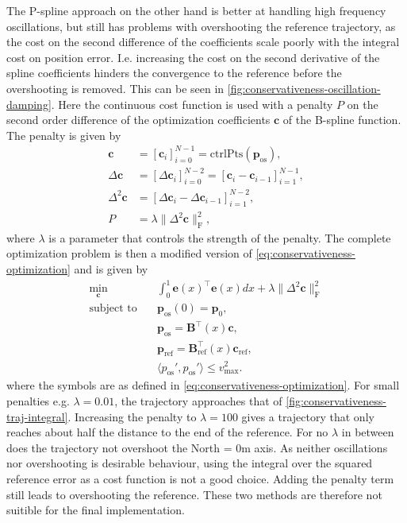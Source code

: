 The P-spline approach on the other hand is better at handling high frequency oscillations, but still has problems with overshooting the reference trajectory, as the cost on the second difference of the coefficients scale poorly with the integral cost on position error. I.e. increasing the cost on the second derivative of the spline coefficients hinders the convergence to the reference before the overshooting is removed. This can be seen in \cref{fig:conservativeness-oscillation-damping}. Here the continuous cost function is used with a penalty $P$ on the second order difference of the optimization coefficients $\mathbf c$ of the B-spline function. The penalty is given by
\begin{equation}\label{eq:conservativeness-oscillation-damping}
    \begin{aligned}
        \mathbf c &= [\mathbf c_i]_{i=0}^{N-1} =
        \text{ctrlPts}\left(\mathbf{p}_\text{os}\right), \\
        \Delta \mathbf c &= [\Delta\mathbf c_i]_{i=0}^{N-2} =
        [\mathbf c_i - \mathbf c_{i-1}]_{i=1}^{N-1}, \\
        \Delta^2 \mathbf c &= [\Delta \mathbf c_i - \Delta \mathbf c_{i-1}]_{i=1}^{N-2}, \\
        P &= \lambda \|\Delta^2 \mathbf c\|_\text{F}^2,
    \end{aligned}
\end{equation}
where $\lambda$ is a parameter that controls the strength of the penalty. The complete optimization problem is then a modified version of \cref{eq:conservativeness-optimization} and is given by
\begin{equation}\label{eq:conservativeness-optimization-penalty}
    \begin{aligned}
        \min_{\mathbf c} \quad & \int_0^1 \mathbf e(x)^\top \mathbf e(x) dx + \lambda \|\Delta^2 \mathbf c\|_\text{F}^2 \\
        \text{subject to} \quad &\mathbf p_\text{os}(0) = \mathbf p_0, \\
                     &\mathbf p_\text{os} = \mathbf B^\top(x) \mathbf c, \\
                     &\mathbf p_\text{ref} = \mathbf B_\text{ref}^\top(x) \mathbf c_\text{ref}, \\
                     &\langle p_\text{os}', p_\text{os}' \rangle \le v_\text{max}^2.
    \end{aligned}
\end{equation}
where the symbols are as defined in \cref{eq:conservativeness-optimization}.
For small penalties e.g. $\lambda=0.01$, the trajectory approaches that of \cref{fig:conservativeness-traj-integral}. Increasing the penalty to $\lambda=100$ gives a trajectory that only reaches about half the distance to the end of the reference. For no $\lambda$ in between does the trajectory not overshoot the North = 0m axis. As neither oscillations nor overshooting is desirable behaviour, using the integral over the squared reference error as a cost function is not a good choice. Adding the penalty term still leads to overshooting the reference. These two methods are therefore not suitible for the final implementation.

